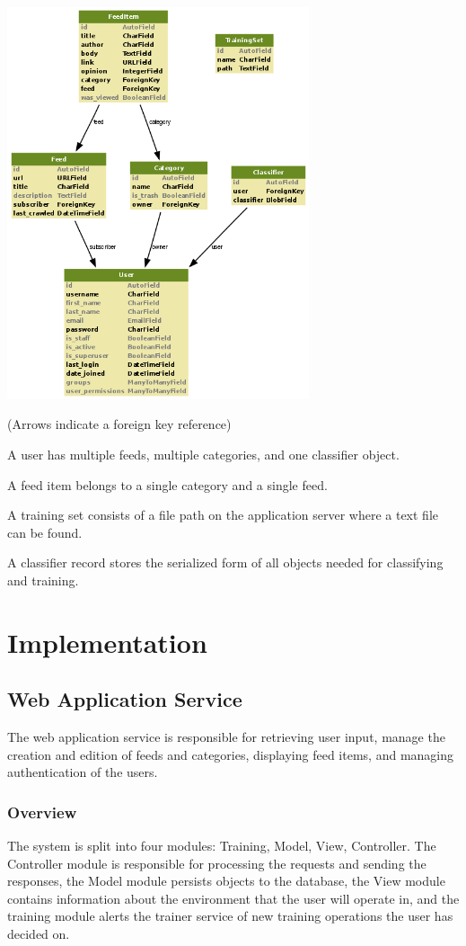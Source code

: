 \documentclass[letterpaper]{article}
\begin{document}
\noindent\includegraphics[width=3.5in]{db-diagram-no-transparency.png}

(Arrows indicate a foreign key reference)

A user has multiple feeds, multiple categories, and one classifier object.

A feed item belongs to a single category and a single feed.

A training set consists of a file path on the application server where a text file can be found.

A classifier record stores the serialized form of all objects needed for classifying and training.

\section{Implementation}
\subsection{Web Application Service}
The web application service is responsible for retrieving user input, manage the creation and edition of feeds and categories, displaying feed items, and managing authentication of the users.

\subsubsection{Overview}
The system is split into four modules: Training, Model, View, Controller.  The Controller module is responsible for processing the requests and sending the responses, the Model module persists objects to the database, the View module contains information about the environment that the user will operate in, and the training module alerts the trainer service of new training operations the user has decided on.
\end{document}
